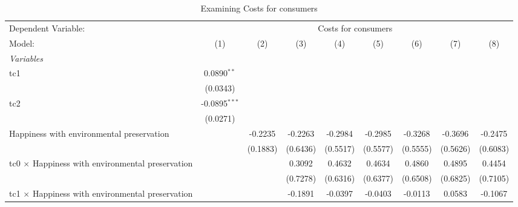
\begin{table}[htbp]
   \caption{Examining Costs for consumers}
   \centering
   \begin{tabular}{lcccccccc}
      \tabularnewline \midrule \midrule
      Dependent Variable: & \multicolumn{8}{c}{Costs for consumers}\\
      Model:                                                  & (1)             & (2)      & (3)      & (4)            & (5)            & (6)            & (7)            & (8)\\  
      \midrule
      \emph{Variables}\\
      tc1                                                     & 0.0890$^{**}$   &          &          &                &                &                &                &   \\   
                                                              & (0.0343)        &          &          &                &                &                &                &   \\   
      tc2                                                     & -0.0895$^{***}$ &          &          &                &                &                &                &   \\   
                                                              & (0.0271)        &          &          &                &                &                &                &   \\   
      Happiness with environmental preservation               &                 & -0.2235  & -0.2263  & -0.2984        & -0.2985        & -0.3268        & -0.3696        & -0.2475\\   
                                                              &                 & (0.1883) & (0.6436) & (0.5517)       & (0.5577)       & (0.5555)       & (0.5626)       & (0.6083)\\   
      tc0 $\times$ Happiness with environmental preservation  &                 &          & 0.3092   & 0.4632         & 0.4634         & 0.4860         & 0.4895         & 0.4454\\   
                                                              &                 &          & (0.7278) & (0.6316)       & (0.6377)       & (0.6508)       & (0.6825)       & (0.7105)\\   
      tc1 $\times$ Happiness with environmental preservation  &                 &          & -0.1891  & -0.0397        & -0.0403        & -0.0113        & 0.0583         & -0.1067\\   

\end{tabular}
\end{table}
